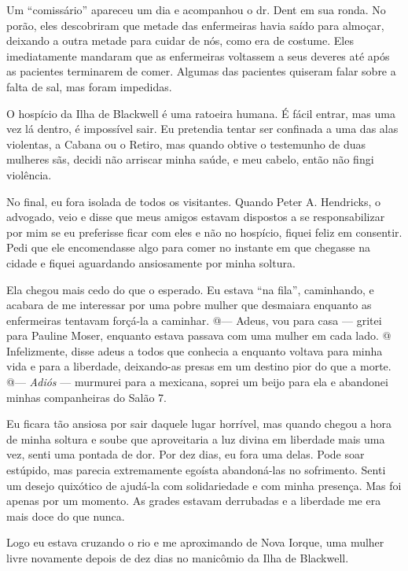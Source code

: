 Um ``comissário'' apareceu um dia e acompanhou o dr. Dent em sua ronda.
No porão, eles descobriram que metade das enfermeiras havia saído para
almoçar, deixando a outra metade para cuidar de nós, como era de
costume. Eles imediatamente mandaram que as enfermeiras voltassem a seus
deveres até após as pacientes terminarem de comer. Algumas das pacientes
quiseram falar sobre a falta de sal, mas foram impedidas.

O hospício da Ilha de Blackwell é uma ratoeira humana. É fácil entrar,
mas uma vez lá dentro, é impossível sair. Eu pretendia tentar ser
confinada a uma das alas violentas, a Cabana ou o Retiro, mas quando
obtive o testemunho de duas mulheres sãs, decidi não arriscar minha
saúde, e meu cabelo, então não fingi violência.

No final, eu fora isolada de todos os visitantes. Quando Peter A.
Hendricks, o advogado, veio e disse que meus amigos estavam dispostos a
se responsabilizar por mim se eu preferisse ficar com eles e não no
hospício, fiquei feliz em consentir. Pedi que ele encomendasse algo para
comer no instante em que chegasse na cidade e fiquei aguardando
ansiosamente por minha soltura.

Ela chegou mais cedo do que o esperado. Eu estava ``na fila'',
caminhando, e acabara de me interessar por uma pobre mulher que
desmaiara enquanto as enfermeiras tentavam forçá-la a caminhar. @---
Adeus, vou para casa --- gritei para Pauline Moser, enquanto estava
passava com uma mulher em cada lado. @ Infelizmente, disse adeus a todos
que conhecia a enquanto voltava para minha vida e para a liberdade,
deixando-as presas em um destino pior do que a morte. @--- \emph{Adiós}
--- murmurei para a mexicana, soprei um beijo para ela e abandonei
minhas companheiras do Salão 7.

Eu ficara tão ansiosa por sair daquele lugar horrível, mas quando chegou
a hora de minha soltura e soube que aproveitaria a luz divina em
liberdade mais uma vez, senti uma pontada de dor. Por dez dias, eu fora
uma delas. Pode soar estúpido, mas parecia extremamente egoísta
abandoná-las no sofrimento. Senti um desejo quixótico de ajudá-la com
solidariedade e com minha presença. Mas foi apenas por um momento. As
grades estavam derrubadas e a liberdade me era mais doce do que nunca.

Logo eu estava cruzando o rio e me aproximando de Nova Iorque, uma
mulher livre novamente depois de dez dias no manicômio da Ilha de
Blackwell.

\label{section-11}

